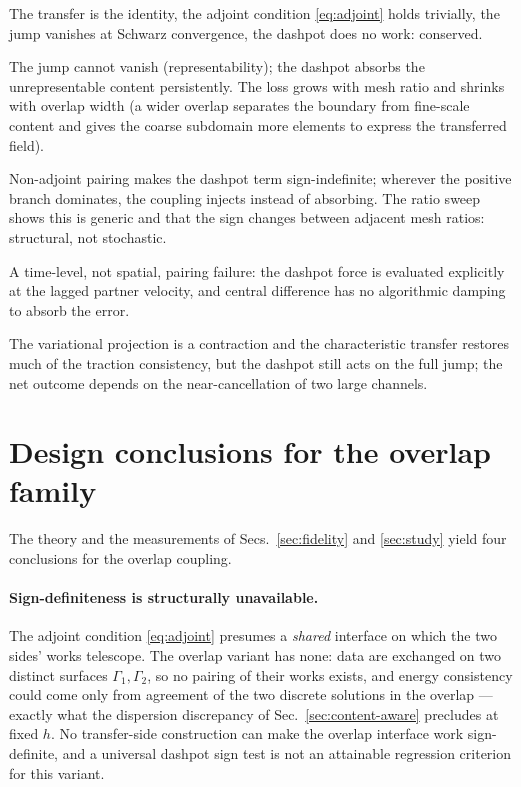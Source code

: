 \documentclass[11pt]{article}
\begin{document}
\begin{description}[style=unboxed,leftmargin=0pt,itemsep=2pt]
  \item[Conforming, implicit.] The transfer is the identity, the adjoint
  condition \eqref{eq:adjoint} holds trivially, the jump vanishes at Schwarz
  convergence, the dashpot does no work: conserved.
  \item[Nonconforming, dissipative majority.] The jump cannot vanish
  (representability); the dashpot absorbs the unrepresentable content
  persistently. The loss grows with mesh ratio and shrinks with overlap
  width (a wider overlap separates the boundary from fine-scale content and gives
  the coarse subdomain more elements to express the transferred field).
  \item[Nonconforming, growth cases.] Non-adjoint pairing makes the dashpot
  term sign-indefinite; wherever the positive branch dominates, the coupling
  injects instead of absorbing. The ratio sweep shows this is generic and
  that the sign changes between adjacent mesh ratios: structural, not
  stochastic.
  \item[Conforming, explicit free subdomain.] A time-level, not spatial,
  pairing failure: the dashpot force is evaluated explicitly at the lagged
  partner velocity, and central difference has no algorithmic damping to
  absorb the error.
  \item[Variational improvement.] The variational projection is a
  contraction and the characteristic transfer restores much of the traction
  consistency, but the dashpot still acts on the full jump; the net outcome
  depends on the near-cancellation of two large channels.
\end{description}

\section{Design conclusions for the overlap family}
\label{sec:overlap-design}

The theory and the measurements of Secs.~\ref{sec:fidelity} and
\ref{sec:study} yield four conclusions for the overlap coupling.

\paragraph{Sign-definiteness is structurally unavailable.} The adjoint
condition \eqref{eq:adjoint} presumes a \emph{shared} interface on which
the two sides' works telescope. The overlap variant has none: data are
exchanged on two distinct surfaces $\Gamma_1, \Gamma_2$, so no pairing of
their works exists, and energy consistency could come only from agreement
of the two discrete solutions in the overlap --- exactly what the
dispersion discrepancy of Sec.~\ref{sec:content-aware} precludes at fixed
$h$. No transfer-side construction can make the overlap interface work
sign-definite, and a universal dashpot sign test is not an attainable
regression criterion for this variant.
\end{document}
